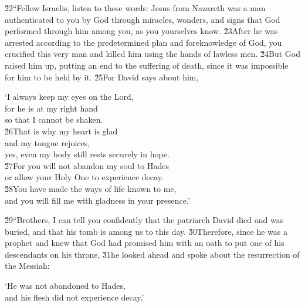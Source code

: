 \v{22}``Fellow Israelis, listen to these words: Jesus from Nazareth was a man authenticated to you by God through miracles, wonders, and signs that God performed through him among you, as you yourselves know. \v{23}After he was arrested according to the predetermined plan and foreknowledge of God, you crucified this very man and killed him using the hands of lawless men. \v{24}But God raised him up, putting an end to the suffering of death, since it was impossible for him to be held by it. \v{25}For David says about him,

\begin{poetry}
\poeml `I always keep my eyes on the Lord, \\
\poemll    for he is at my right hand \\
\poemlll       so that I cannot be shaken. \\
\poeml \v{26}That is why my heart is glad \\
\poemll    and my tongue rejoices, \\
\poemlll       yes, even my body still rests securely in hope. \\
\poeml \v{27}For you will not abandon my soul to Hades \\
\poemll    or allow your Holy One to experience decay. \\
\poeml \v{28}You have made the ways of life known to me, \\
\poemll    and you will fill me with gladness in your presence.'
\end{poetry}

\v{29}``Brothers, I can tell you confidently that the patriarch David died and was buried, and that his tomb is among us to this day. \v{30}Therefore, since he was a prophet and knew that God had promised him with an oath to put one of his descendants on his throne, \v{31}he looked ahead and spoke about the resurrection of the Messiah:

\begin{poetry}
\poeml `He was not abandoned to Hades, \\
\poemll    and his flesh did not experience decay.'
\end{poetry}

